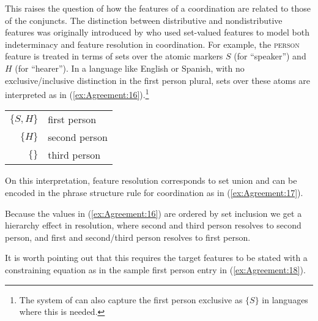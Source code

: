\documentclass[output=paper,hidelinks]{langscibook}
\begin{document}
This raises the question of how the features of a coordination are
related to those of the conjuncts. The distinction between
distributive and nondistributive features was originally introduced by
\citet{DalrympleKaplan2000} who used set-valued features to model both
indeterminacy and feature resolution in coordination. For example, the
\textsc{person} feature is treated in terms of sets over the atomic
markers $S$ (for ``speaker'') and $H$ (for ``hearer''). In a language
like English or Spanish, with no exclusive/inclusive distinction in
the first person plural, sets over these atoms are interpreted as in (\ref{ex:Agreement:16}).\footnote{The system of \citet{DalrympleKaplan2000} can also capture the first person exclusive as $\{S\}$ in languages where this is needed.}

\ea\label{ex:Agreement:16}
\begin{tabular}[t]{rl}
  $\{S,H\}$ & first person \\
  $\{H\}$ &  second person \\
  $\{\}$ &  third person \\
\end{tabular}
\z
On this interpretation, feature resolution corresponds to set union
and can be encoded in the phrase structure rule for coordination as in
(\ref{ex:Agreement:17}).

\ea\label{ex:Agreement:17}
\z
Because the values in (\ref{ex:Agreement:16}) are ordered by set inclusion we get a
hierarchy effect in resolution, where second and third person resolves
to second person, and first and second/third person resolves to first
person.

It is worth pointing out that this requires the target features to be
stated with a constraining equation as in the sample first person
entry in (\ref{ex:Agreement:18}).
\end{document}
